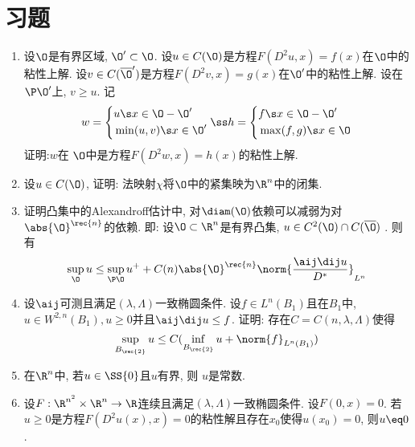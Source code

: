 \section{习题}
\begin{enumerate}
    \item 设$\O$是有界区域, $\O' \subset \O$.  设$u \in C(\O)$是方程$F(D^2u, x)=f(x)$在$\O$中的粘性上解.  设$v \in C(\overline{\O}')$是方程$F(D^2v, x)=g(x)$在$\O'$中的粘性上解.  设在$\P \O'$上, $v \ge u$.  记
    \begin{equation}
        w=\left \{
            \begin{aligned}
                &u \s  x \in \O - \O'\\
                &\min(u, v) \s x \in \O'
            \end{aligned}
            \right.  
            \ss
        h=\left \{
            \begin{aligned}
                &f \s x \in \O - \O' \\
                &\max(f, g) \s x \in \O
            \end{aligned}
            \right.  
    \end{equation}
    证明:$w$在 $\O$中是方程$F(D^2w, x)=h(x)$的粘性上解.  
    \item 设$u \in C(\O)$, 证明: 法映射$\chi$将$\O$中的紧集映为$\R^n$中的闭集.  
    \item 证明凸集中的Alexandroff估计中, 对$\diam(\O)$依赖可以减弱为对$\abs{\O}^\rec{n}$的依赖.  即: 设$\O\subset \R^n$是有界凸集, $u \in C^2(\O) \cap C(\overline{\O})$ .  则有
    \begin{equation}
        \sup_\O u \le \sup_{\P \O}u^+ + C(n)\abs{\O}^\rec{n}\norm{\frac{\aij \dij u}{D^*}}_{L^n}
    \end{equation}
    \item 设$\aij$可测且满足$(\lambda, \Lambda)$一致椭圆条件.  设$f \in L^n(B_1)$且在$B_1$中, $u \in W^{2, n}(B_1), u \ge 0$并且$ \aij \dij u \le f$.  证明: 存在$C=C(n, \lambda, \Lambda)$使得
    \begin{equation}
        \sup_{B_\rec{2}}u \le C(\inf_{B_\rec{2}}u+\norm{f}_{L^n(B_1)})
    \end{equation}
    \item 在$\R^n$中, 若$u \in \SS{0}$且$u$有界, 则 $u$是常数.  
    \item 设$F:\R^{n^2}\times \R^n \to \R$连续且满足$(\lambda, \Lambda)$一致椭圆条件.  设$F(0, x)=0$.  若$u \ge 0$是方程$F(D^2u(x), x)=0$的粘性解且存在$x_0$使得$u(x_0)=0$, 则$u\eq 0$.  
\end{enumerate}